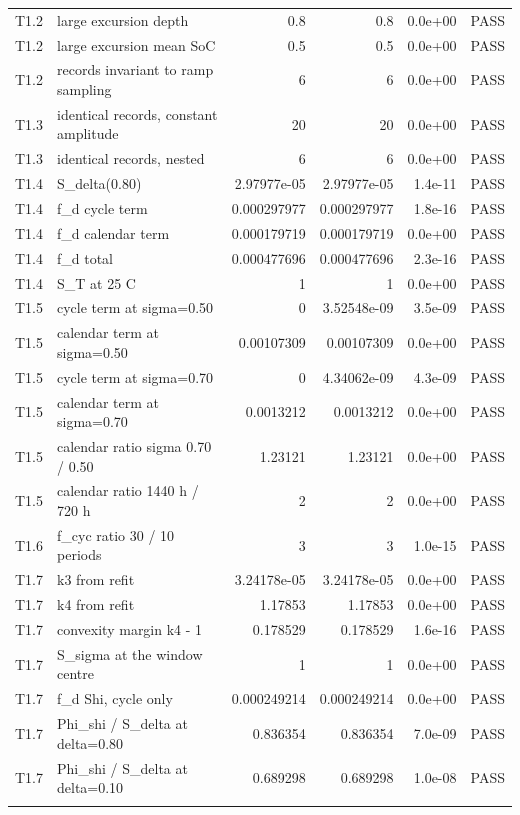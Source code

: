 \begin{tabular}{llrrrl}
T1.2 & large excursion depth & 0.8 & 0.8 & 0.0e+00 & PASS \\
T1.2 & large excursion mean SoC & 0.5 & 0.5 & 0.0e+00 & PASS \\
T1.2 & records invariant to ramp sampling & 6 & 6 & 0.0e+00 & PASS \\
T1.3 & identical records, constant amplitude & 20 & 20 & 0.0e+00 & PASS \\
T1.3 & identical records, nested & 6 & 6 & 0.0e+00 & PASS \\
T1.4 & S\_delta(0.80) & 2.97977e-05 & 2.97977e-05 & 1.4e-11 & PASS \\
T1.4 & f\_d cycle term & 0.000297977 & 0.000297977 & 1.8e-16 & PASS \\
T1.4 & f\_d calendar term & 0.000179719 & 0.000179719 & 0.0e+00 & PASS \\
T1.4 & f\_d total & 0.000477696 & 0.000477696 & 2.3e-16 & PASS \\
T1.4 & S\_T at 25 C & 1 & 1 & 0.0e+00 & PASS \\
T1.5 & cycle term at sigma=0.50 & 0 & 3.52548e-09 & 3.5e-09 & PASS \\
T1.5 & calendar term at sigma=0.50 & 0.00107309 & 0.00107309 & 0.0e+00 & PASS \\
T1.5 & cycle term at sigma=0.70 & 0 & 4.34062e-09 & 4.3e-09 & PASS \\
T1.5 & calendar term at sigma=0.70 & 0.0013212 & 0.0013212 & 0.0e+00 & PASS \\
T1.5 & calendar ratio sigma 0.70 / 0.50 & 1.23121 & 1.23121 & 0.0e+00 & PASS \\
T1.5 & calendar ratio 1440 h / 720 h & 2 & 2 & 0.0e+00 & PASS \\
T1.6 & f\_cyc ratio 30 / 10 periods & 3 & 3 & 1.0e-15 & PASS \\
T1.7 & k3 from refit & 3.24178e-05 & 3.24178e-05 & 0.0e+00 & PASS \\
T1.7 & k4 from refit & 1.17853 & 1.17853 & 0.0e+00 & PASS \\
T1.7 & convexity margin k4 - 1 & 0.178529 & 0.178529 & 1.6e-16 & PASS \\
T1.7 & S\_sigma at the window centre & 1 & 1 & 0.0e+00 & PASS \\
T1.7 & f\_d Shi, cycle only & 0.000249214 & 0.000249214 & 0.0e+00 & PASS \\
T1.7 & Phi\_shi / S\_delta at delta=0.80 & 0.836354 & 0.836354 & 7.0e-09 & PASS \\
T1.7 & Phi\_shi / S\_delta at delta=0.10 & 0.689298 & 0.689298 & 1.0e-08 & PASS \\
\noalign{\smallskip}\hline
\end{tabular}
